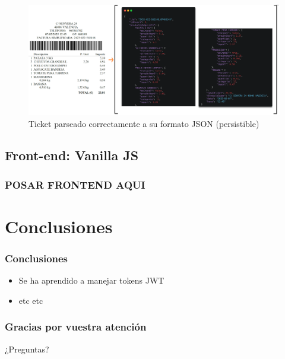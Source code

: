 \documentclass{beamer}
\begin{document}
	
	\begin{frame}

		\begin{figure}
			\centering
			\includegraphics[width=1\linewidth]{imgEspecifiques/ticketFinal}
			\caption{Ticket parseado correctamente a su formato JSON (persistible)}
			\label{fig:ticketFinal}
		\end{figure}
		
	\end{frame}
	
	
	
		\subsection{Front-end: Vanilla JS}
		
		\begin{frame}
			\frametitle{POSAR FRONTEND AQUI}
			
			
		\end{frame}
	
	
	
	
	
	
	
	
	
	
	
	
	
	
	
	
	
	
	
	
	
	
	
	
	
	
	
	\section{Conclusiones}
	
	\begin{frame}
		\frametitle{Conclusiones}
		\begin{itemize}
			\item Se ha aprendido a manejar tokens JWT
			\item etc etc
		\end{itemize}
	\end{frame}
	
	\begin{frame}
		\frametitle{Gracias por vuestra atención}
		¿Preguntas?
	\end{frame}
	
	
	
	
	
	
	
	
	
\end{document}
